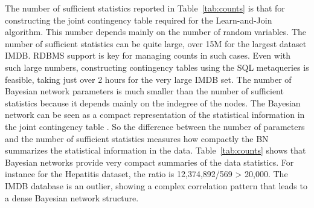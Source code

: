 \documentclass{acm_proc_article-sp}
\begin{document}
The number of sufficient statistics reported in Table~\ref{tab:counts}  is that for constructing the joint contingency table required for the Learn-and-Join algorithm. This number depends mainly on the number of random variables. The number of sufficient statistics can be quite large, over 15M for the largest dataset IMDB. RDBMS support is key for managing counts in such cases. Even with such large numbers, constructing contingency tables using the SQL metaqueries is feasible, taking just over 2 hours for the very large IMDB set. 
The number of Bayesian network parameters is much smaller than the number of sufficient statistics because it depends mainly on the indegree of the nodes. The Bayesian network can be seen as a compact representation of the statistical information in the joint contingency table \cite{Schulte2014}. So the difference between the number of parameters and the number of sufficient statistics measures how compactly the BN summarizes the statistical information in the data.  Table~\ref{tab:counts} shows that Bayesian networks provide very compact summaries of the data statistics. For instance for the Hepatitis dataset, the ratio is  12,374,892/569 > 20,000. The IMDB database is an outlier, showing a complex correlation pattern that leads to a dense Bayesian network structure.
\end{document}
